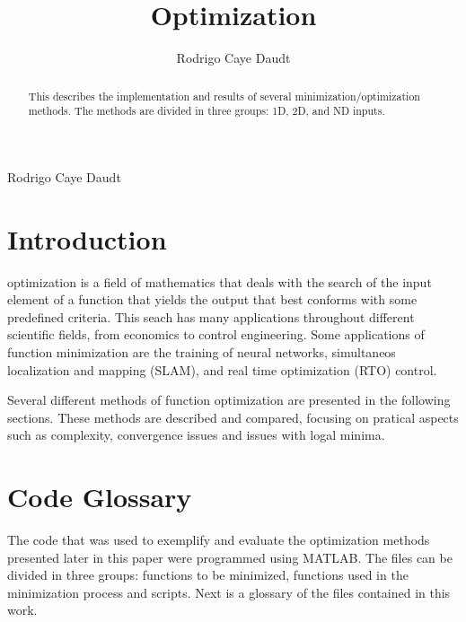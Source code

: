 \documentclass[journal]{IEEEtran}
\begin{document}
\title{Optimization}

\author{Rodrigo Caye Daudt}

%
{Rodrigo Caye Daudt}


\maketitle


\begin{abstract}
This describes the implementation and results of several minimization/optimization methods. The methods are divided in three groups: 1D, 2D, and ND inputs.
\end{abstract}




\IEEEpeerreviewmaketitle


\section{Introduction}

 optimization is a field of mathematics that deals with the search of the input element of a function that yields the output that best conforms with some predefined criteria. This seach has many applications throughout different scientific fields, from economics to control engineering. Some applications of function minimization are the training of neural networks, simultaneos localization and mapping (SLAM), and real time optimization (RTO) control.

Several different methods of function optimization are presented in the following sections. These methods are described and compared, focusing on pratical aspects such as complexity, convergence issues and issues with logal minima.




\section{Code Glossary}

The code that was used to exemplify and evaluate the optimization methods presented later in this paper were programmed using MATLAB. The files can be divided in three groups: functions to be minimized, functions used in the minimization process and scripts. Next is a glossary of the files contained in this work.
\end{document}
